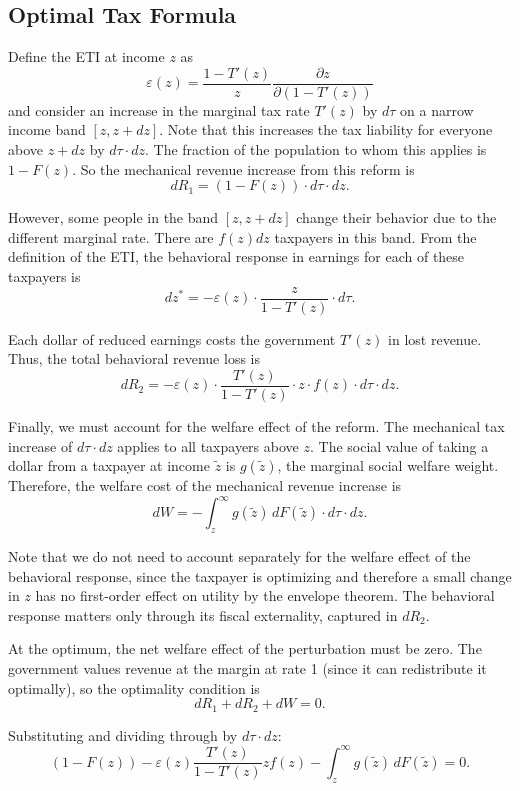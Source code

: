\documentclass[12pt]{article}
\begin{document}
\subsection{Optimal Tax Formula}
Define the ETI at income $z$ as
$$\varepsilon(z) = \frac{1-T'(z)}{z} \frac{\partial z}{\partial (1-T'(z))}$$
and consider an increase in the marginal tax rate $T'(z)$ by $d\tau$ on a narrow income band $[z, z+dz]$. Note that this increases the tax liability for everyone above $z+dz$ by $d\tau \cdot dz$. The fraction of the population to whom this applies is $1-F(z)$. So the mechanical revenue increase from this reform is
$$dR_1 = (1-F(z)) \cdot d\tau \cdot dz.$$

However, some people in the band $[z, z+dz]$ change their behavior due to the different marginal rate. There are $f(z)dz$ taxpayers in this band. From the definition of the ETI, the behavioral response in earnings for each of these taxpayers is
$$dz^* = -\varepsilon(z) \cdot \frac{z}{1-T'(z)} \cdot d\tau.$$

Each dollar of reduced earnings costs the government $T'(z)$ in lost revenue. Thus, the total behavioral revenue loss is
$$dR_2 = -\varepsilon(z) \cdot \frac{T'(z)}{1-T'(z)} \cdot z \cdot f(z) \cdot d\tau \cdot dz.$$

Finally, we must account for the welfare effect of the reform. The mechanical tax increase of $d\tau \cdot dz$ applies to all taxpayers above $z$. The social value of taking a dollar from a taxpayer at income $\tilde{z}$ is $g(\tilde{z})$, the marginal social welfare weight. Therefore, the welfare cost of the mechanical revenue increase is
$$dW = -\int_{z}^{\infty} g(\tilde{z}) \, dF(\tilde{z}) \cdot d\tau \cdot dz.$$

Note that we do not need to account separately for the welfare effect of the behavioral response, since the taxpayer is optimizing and therefore a small change in $z$ has no first-order effect on utility by the envelope theorem. The behavioral response matters only through its fiscal externality, captured in $dR_2$.

At the optimum, the net welfare effect of the perturbation must be zero. The government values revenue at the margin at rate 1 (since it can redistribute it optimally), so the optimality condition is
$$dR_1 + dR_2 + dW = 0.$$

Substituting and dividing through by $d\tau \cdot dz$:
$$(1-F(z)) - \varepsilon(z) \frac{T'(z)}{1-T'(z)} z f(z) - \int_{z}^{\infty} g(\tilde{z}) \, dF(\tilde{z}) = 0.$$
\end{document}
